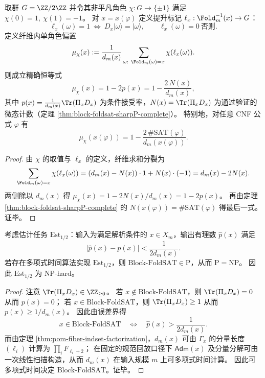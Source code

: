 \begin{proposition}\label{prop:block-foldsat-single-character-bias-sharp-sat}
取群 \(G=\ZZ/2\ZZ\) 并令其非平凡角色 \(\chi:G\to\{\pm 1\}\) 满足 \(\chi(0)=1,\ \chi(1)=-1\)。
对 \(x=x(\varphi)\) 定义提升标记 \(\ell_x:\Fold_m^{-1}(x)\to G\)：
\[
\ell_x(\omega)=1\ \Longleftrightarrow\ D_x|\omega\rangle=|\omega\rangle,
\qquad
\ell_x(\omega)=0\ \text{否则}.
\]
定义纤维内单角色偏置
\[
\mu_{\chi}(x):=\frac{1}{d_m(x)}\sum_{\omega:\ \Fold_m(\omega)=x}\chi(\ell_x(\omega)).
\]
则成立精确恒等式
\[
\mu_{\chi}(x)=1-2p(x)=1-\frac{2\,N(x)}{d_m(x)},
\]
其中 \(p(x)=\frac{1}{d_m(x)}\Tr(\Pi_xD_x)\) 为条件接受率，\(N(x)=\Tr(\Pi_xD_x)\) 为通过验证的微态计数（定理 \ref{thm:block-foldsat-sharpP-complete}）。
特别地，对任意 CNF 公式 \(\varphi\) 有
\[
\mu_{\chi}(x(\varphi))=1-\frac{2\,\#\mathrm{SAT}(\varphi)}{d_m(x(\varphi))}.
\]
\end{proposition}

\begin{proof}
由 \(\chi\) 的取值与 \(\ell_x\) 的定义，纤维求和分裂为
\[
\sum_{\Fold_m(\omega)=x}\chi(\ell_x(\omega))
=(d_m(x)-N(x))\cdot 1+N(x)\cdot(-1)
=d_m(x)-2N(x).
\]
两侧除以 \(d_m(x)\) 得 \(\mu_{\chi}(x)=1-2N(x)/d_m(x)=1-2p(x)\)。
再由定理 \ref{thm:block-foldsat-sharpP-complete} 的 \(N(x(\varphi))=\#\mathrm{SAT}(\varphi)\) 得最后一式。证毕。
\end{proof}

\begin{proposition}\label{prop:block-foldsat-estimation-np-hard}
考虑估计任务 \(\mathrm{Est}_{1/2}\)：输入为满足解析条件的 \(x\in X_m\)，输出有理数 \(\widehat p(x)\) 满足
\[
\bigl|\widehat p(x)-p(x)\bigr|<\frac{1}{2d_m(x)}.
\]
若存在多项式时间算法实现 \(\mathrm{Est}_{1/2}\)，则 \(\mathrm{Block}\text{-}\mathrm{FoldSAT}\in\mathrm{P}\)，从而 \(\mathrm{P}=\mathrm{NP}\)。
因此 \(\mathrm{Est}_{1/2}\) 为 NP-hard。
\end{proposition}

\begin{proof}
注意 \(\Tr(\Pi_xD_x)\in\ZZ_{\ge 0}\)。
若 \(x\notin\mathrm{Block}\text{-}\mathrm{FoldSAT}\)，则 \(\Tr(\Pi_xD_x)=0\) 从而 \(p(x)=0\)；
若 \(x\in\mathrm{Block}\text{-}\mathrm{FoldSAT}\)，则 \(\Tr(\Pi_xD_x)\ge 1\) 从而 \(p(x)\ge 1/d_m(x)\)。
因此由误差界得
\[
x\in\mathrm{Block}\text{-}\mathrm{FoldSAT}
\quad\Longleftrightarrow\quad
\widehat p(x)>\frac{1}{2d_m(x)}.
\]
而由定理 \ref{thm:pom-fiber-indset-factorization}，\(d_m(x)\) 可由 \(\Gamma_x\) 的分量长度 \((\ell_i)\) 计算为 \(\prod_i F_{\ell_i+2}\)；
在固定的规范回放口径下 \(\mathsf{Adm}(x)\) 及分量分解可由一次线性扫描构造，从而 \(d_m(x)\) 在输入规模 \(m\) 上可多项式时间计算。
因此可多项式时间决定 \(\mathrm{Block}\text{-}\mathrm{FoldSAT}\)。证毕。
\end{proof}

